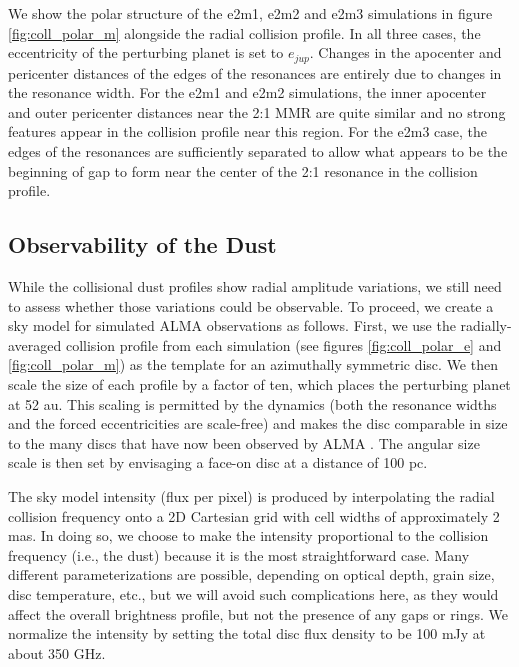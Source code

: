 \documentclass[fleqn,usenatbib]{mnras}
\begin{document}
We show the polar structure of the e2m1, e2m2 and e2m3 simulations in figure \ref{fig:coll_polar_m} alongside the radial collision profile. In all three 
cases, the eccentricity of the perturbing planet is set to $e_{jup}$. Changes in the apocenter and pericenter distances of the edges of the 
resonances are entirely due to changes in the resonance width. For the e2m1 and e2m2 simulations, the inner apocenter and outer pericenter 
distances near the 2:1 MMR are quite similar and no strong features appear in the collision profile near this region. For the e2m3 case, the edges of
the resonances are sufficiently separated to allow what appears to be the beginning of gap to form near the center of the 2:1 resonance in the collision profile.

\subsection{Observability of the Dust}

While the collisional dust profiles show radial amplitude variations, we still need to assess whether those variations could be observable. To proceed, 
we create a sky model for simulated ALMA observations as follows. First, we use the radially-averaged collision profile from each simulation (see figures 
\ref{fig:coll_polar_e} and \ref{fig:coll_polar_m}) as the template for an azimuthally symmetric disc. We then scale the size of each profile by a factor of 
ten, which places the perturbing planet at 52 au. This scaling is permitted by the dynamics (both the resonance widths and the forced eccentricities 
are scale-free) and makes the disc comparable in size to the many discs that have now been observed by ALMA \citep{2018ApJ...869L..42H}. The 
angular size scale is then set by envisaging a face-on disc at a distance of 100 pc.  

The sky model intensity (flux per pixel) is produced by interpolating the radial collision frequency onto a 2D Cartesian grid with cell widths of 
approximately 2 mas. In doing so, we choose to make the intensity proportional to the collision frequency (i.e., the dust) because it is the most 
straightforward case. Many different parameterizations are possible, depending on optical depth, grain size, disc temperature, etc., but we will avoid 
such complications here, as they would affect the overall brightness profile, but not the presence of any gaps or rings. We normalize the intensity by
setting the total disc flux density to be 100 mJy at about 350 GHz.  
\end{document}
